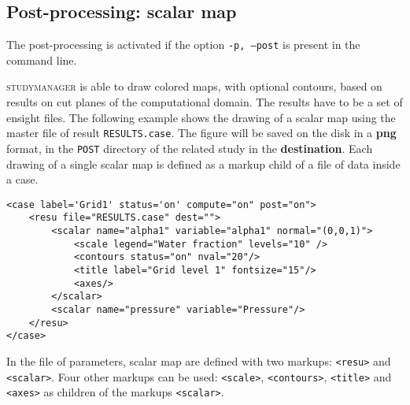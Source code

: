 \documentclass[a4paper,10pt,twoside]{csshortdoc}
\begin{document}
\subsection{Post-processing: scalar map}

The post-processing is activated if the option \texttt{-p, --post} is present
in the command line.

\textsc{studymanager} is able to draw colored maps, with optional contours, based on
results on cut planes of the computational domain. The results have to be a set of
ensight files. The following example shows the drawing of a scalar map using the
master file of result \texttt{RESULTS.case}. The figure will be saved on the
disk in a \textbf{png} format, in the \texttt{POST} directory of the related
study in the \textbf{destination}. Each drawing of a single scalar map is
defined as a markup child of a file of data inside a case.

\small
\begin{verbatim}
<case label='Grid1' status='on' compute="on" post="on">
    <resu file="RESULTS.case" dest="">
        <scalar name="alpha1" variable="alpha1" normal="(0,0,1)">
            <scale legend="Water fraction" levels="10" />
            <contours status="on" nval="20"/>
            <title label="Grid level 1" fontsize="15"/>
            <axes/>
        </scalar>
        <scalar name="pressure" variable="Pressure"/>
    </resu>
</case>
\end{verbatim}
\normalsize

In the file of parameters, scalar map are defined with two markups:
\texttt{<resu>} and \texttt{<scalar>}. Four other markups can be used:
\texttt{<scale>}, \texttt{<contours>}, \texttt{<title>} and \texttt{<axes>} as
children of the markups \texttt{<scalar>}.
\end{document}
